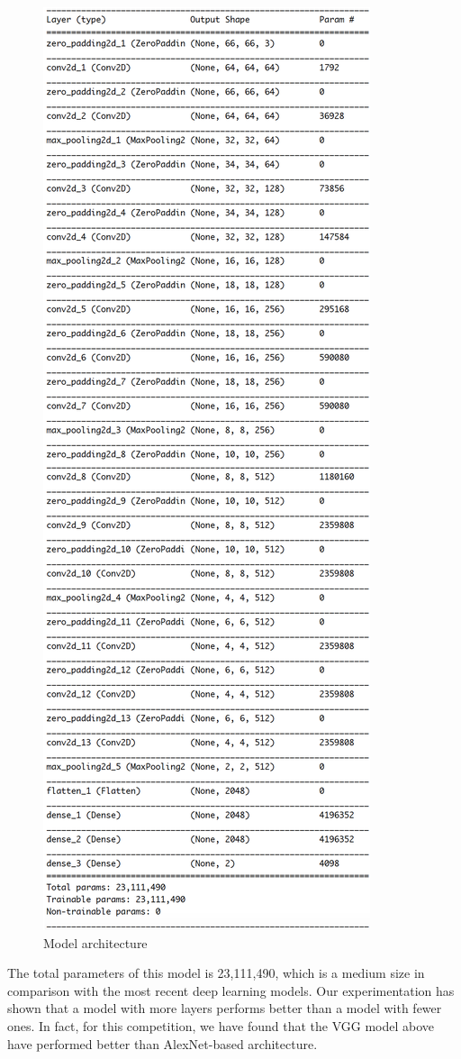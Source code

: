 \documentclass[a4paper]{article}
\begin{document}
\begin{figure}[h!]
\centering
\includegraphics[scale=0.4]{VGG_arch.png}
\caption{Model architecture}
\label{fig:vgg}
\end{figure}
%
The total parameters of this model is 23,111,490, which is a medium size in comparison with the most recent deep learning models.
%
Our experimentation has shown that a model with more layers performs better than a model with fewer ones. In fact, for this competition, we have found that the VGG model above have performed better than AlexNet-based architecture.
\end{document}
